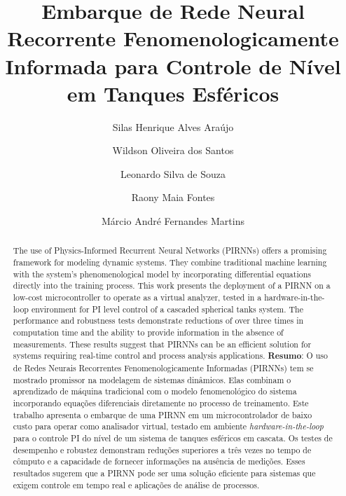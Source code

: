 \documentclass[a4paper]{ifacconf}
\begin{document}

\begin{frontmatter}
  \title{Embarque de Rede Neural Recorrente Fenomenologicamente Informada para Controle de Nível em Tanques Esféricos}
  \author[poli-ufba]{Silas Henrique Alves Araújo}
  \author[poli-ufba]{Wildson Oliveira dos Santos}
  \author[poli-ufba]{Leonardo Silva de Souza}
  \author[poli-ufba]{Raony Maia Fontes}
  \author[poli-ufba]{Márcio André Fernandes Martins}

  \address[poli-ufba]{Escola Politécnica, Universidade Federal da Bahia, BA, (e-mail: silasaraujo@ufba.br, wildson.oliveira@ufba.br, lssouza@ufba.br, raony@ufba.br, marciomartins@ufba.br)}


  \renewcommand{\abstractname}{{\bf Abstract:~}}
  \begin{abstract}
    The use of Physics-Informed Recurrent Neural Networks (PIRNNs) offers a promising framework for modeling dynamic systems. They combine traditional machine learning with the system's phenomenological model by incorporating differential equations directly into the training process.
    This work presents the deployment of a PIRNN on a low-cost microcontroller to operate as a virtual analyzer, tested in a hardware-in-the-loop environment for PI level control of a cascaded spherical tanks system.
    The performance and robustness tests demonstrate reductions of over three times in computation time and the ability to provide information in the absence of measurements. These results suggest that PIRNNs can be an efficient solution for systems requiring real-time control and process analysis applications.
    \vskip 1mm
    {\noindent \bf Resumo}:  O uso de Redes Neurais Recorrentes Fenomenologicamente Informadas (PIRNNs) tem se mostrado promissor na modelagem de sistemas dinâmicos. Elas combinam o aprendizado de máquina tradicional com o modelo fenomenológico do sistema incorporando equações diferenciais diretamente no processo de treinamento.
    Este trabalho apresenta o embarque de uma PIRNN em um microcontrolador de baixo custo para operar como analisador virtual, testado em ambiente \textit{hardware-in-the-loop} para o controle PI do nível de um sistema de tanques esféricos em cascata.
    Os testes de desempenho e robustez demonstram reduções superiores a três vezes no tempo de cômputo e a capacidade de fornecer informações na ausência de medições. Esses resultados sugerem que a PIRNN pode ser uma solução eficiente para sistemas que exigem controle em tempo real e aplicações de análise de processos.
  \end{abstract}


\end{frontmatter}
\end{document}
